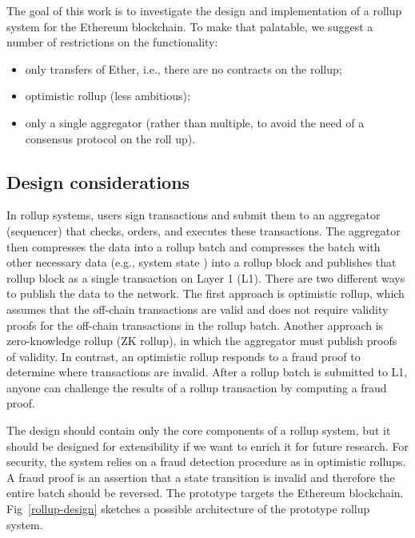 \documentclass{article}
\begin{document}
The goal of this work is to investigate the design and implementation of a rollup system for the Ethereum blockchain. To make that palatable, we suggest a number of restrictions on the functionality:
\begin{itemize}
\item only transfers of Ether, i.e., there are no contracts on the rollup;
\item optimistic rollup (less ambitious);
\item only a single aggregator (rather than multiple, to avoid the need of a consensus protocol on the roll up).
\end{itemize}

\subsection{Design considerations}
\label{sec:design-consy}

In rollup systems, users sign transactions and submit them to an aggregator (sequencer) that checks, orders, and executes these transactions. The aggregator then compresses the data into a rollup batch and compresses the batch with other necessary data (e.g., system state ) into a rollup block and publishes that rollup block as a single transaction on Layer 1 (L1). There are two different ways to publish the data to the network. The first approach is optimistic rollup, which assumes that the off-chain transactions are valid and does not require validity proofs for the off-chain transactions in the rollup batch. Another approach is zero-knowledge rollup (ZK rollup), in which the aggregator must publish proofs of validity. In contrast, an optimistic rollup responds to a fraud proof to determine where transactions are invalid. After a rollup batch is submitted to L1, anyone can challenge the results of a rollup transaction by computing a fraud proof.

The design should contain only the core components of a rollup system, but it should be designed for extensibility if we want to enrich it for future research. For security, the system relies on a fraud 
detection procedure as in optimistic rollups. A fraud proof is an assertion that a state transition
is invalid and therefore the entire batch should be reversed. The prototype targets the Ethereum
blockchain. Fig~\ref{rollup-design} sketches a possible architecture of the prototype rollup system.
\end{document}
